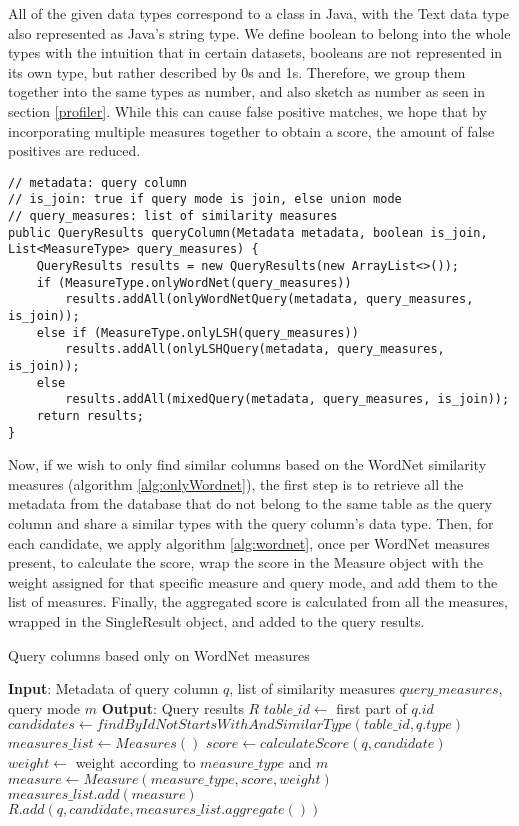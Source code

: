 All of the given data types correspond to a class in Java, with the Text data type also represented as Java's string type. We define boolean to belong into the whole types with the intuition that in certain datasets, booleans are not represented in its own type, but rather described by 0s and 1s. Therefore, we group them together into the same types as number, and also sketch as number as seen in section \ref{profiler}. While this can cause false positive matches, we hope that by incorporating multiple measures together to obtain a score, the amount of false positives are reduced.

\begin{lstlisting}[caption=Overview of the queryColumn() method, label=lst:queryColumn]
// metadata: query column
// is_join: true if query mode is join, else union mode
// query_measures: list of similarity measures
public QueryResults queryColumn(Metadata metadata, boolean is_join, List<MeasureType> query_measures) {
    QueryResults results = new QueryResults(new ArrayList<>());
    if (MeasureType.onlyWordNet(query_measures))
        results.addAll(onlyWordNetQuery(metadata, query_measures, is_join));
    else if (MeasureType.onlyLSH(query_measures))
        results.addAll(onlyLSHQuery(metadata, query_measures, is_join));
    else
        results.addAll(mixedQuery(metadata, query_measures, is_join));
    return results;
}
\end{lstlisting}

Now, if we wish to only find similar columns based on the WordNet similarity measures (algorithm \ref{alg:onlyWordnet}), the first step is to retrieve all the metadata from the database that do not belong to the same table as the query column and share a similar types with the query column's data type. Then, for each candidate, we apply algorithm \ref{alg:wordnet}, once per WordNet measures present, to calculate the score, wrap the score in the Measure object with the weight assigned for that specific measure and query mode, and add them to the list of measures. Finally, the aggregated score is calculated from all the measures, wrapped in the SingleResult object, and added to the query results.

\begin{algorithm}
    \caption{Query columns based only on WordNet measures}
    \label{alg:onlyWordnet}
    \begin{algorithmic}[1]
\STATE \textbf{Input}: Metadata of query column $q$, list of similarity measures $query\_measures$, query mode $m$
\STATE \textbf{Output}: Query results $R$
\STATE $table\_id \gets$ first part of $q.id$ 
\STATE $candidates \gets findByIdNotStartsWithAndSimilarType(table\_id, q.type)$
\STATE $measures\_list \gets Measures()$
\STATE $score \gets calculateScore(q, candidate)$
\STATE $weight \gets$ weight according to $measure\_type$ and $m$
\STATE $measure \gets Measure(measure\_type, score, weight)$
\STATE $measures\_list.add(measure)$
\ENDFOR
\STATE $R.add(q, candidate, measures\_list.aggregate())$
\ENDFOR
    \end{algorithmic}
\end{algorithm}

